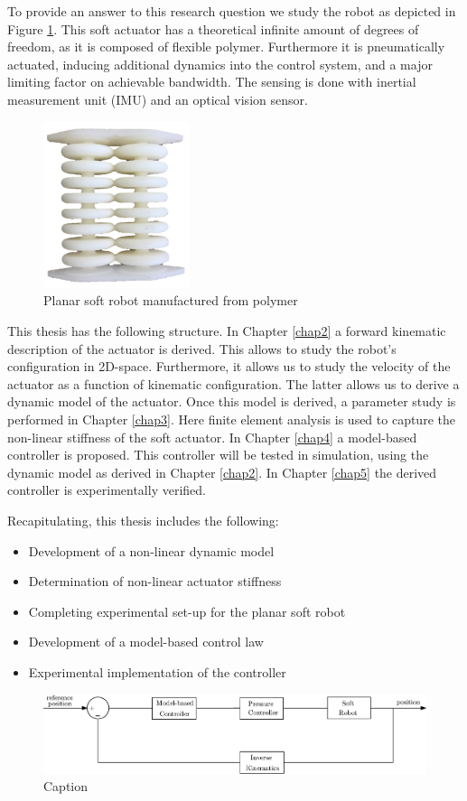 To provide an answer to this research question we study the robot as depicted in Figure \ref{fig1:actuator}. This soft actuator has a theoretical infinite amount of degrees of freedom, as it is composed of flexible polymer. Furthermore it is pneumatically actuated, inducing additional dynamics into the control system, and a major limiting factor on achievable bandwidth. The sensing is done with inertial measurement unit (IMU) and an optical vision sensor. 

\begin{figure}[H]
    \centering
    \includegraphics[width = 
   0.38\textwidth]{Figures/Chapter1/actuator.png}
    \caption{Planar soft robot manufactured from polymer}
    \label{fig1:actuator}
\end{figure}

This thesis has the following structure. In Chapter \ref{chap2} a forward kinematic description of the actuator is derived. This allows to study the robot's configuration in 2D-space. Furthermore, it allows us to study the velocity of the actuator as a function of kinematic configuration. The latter allows us to derive a dynamic model of the actuator. Once this model is derived, a parameter study is performed in Chapter \ref{chap3}. Here finite element analysis is used to capture the non-linear stiffness of the soft actuator. In Chapter \ref{chap4} a model-based controller 
is proposed. This controller will be tested in simulation, using the dynamic model as derived in Chapter \ref{chap2}. In Chapter \ref{chap5} the derived controller is experimentally verified. 

Recapitulating, this thesis includes the following:


\begin{itemize}
    \item Development of a non-linear dynamic model
    \item Determination of non-linear actuator stiffness
    \item Completing experimental set-up for the planar soft robot 
    \item Development of a model-based control law
    \item Experimental implementation of the controller
\end{itemize}

\begin{figure}[H]
    \centering
    \includegraphics{Figures/Chapter1/controlscheme.eps}
    \caption{Caption}
    \label{fig:my_label}
\end{figure}